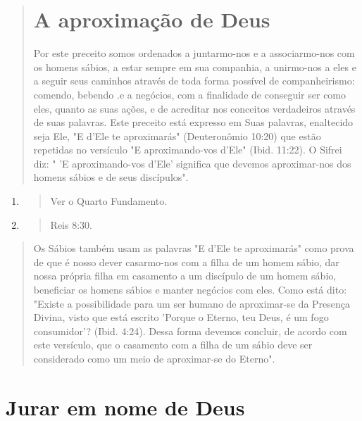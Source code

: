 \begin{quote}
\section{A aproximação de Deus}

Por este preceito somos ordenados a juntarmo-nos e a associarmo-nos com
os homens sábios, a estar sempre em sua companhia, a unirmo-nos a eles e
a seguir seus caminhos através de toda forma possível de
companheiris­mo: comendo, bebendo .e a negócios, com a finalidade de
conseguir ser como eles, quanto as suas ações, e de acreditar nos
conceitos verdadeiros através de suas palavras. Este preceito está
expresso em Suas palavras, enaltecido seja Ele, "E d'Ele te aproximarás"
(Deuteronômio 10:20) que estão repetidas no versí­culo "E
aproximando-vos d'Ele" (Ibid. 11:22). O Sifrei diz: " 'E aproximando-vos
d'Ele' significa que devemos aproximar-nos dos homens sábios e de seus
discípulos".
\end{quote}

\begin{enumerate}
\def\labelenumi{\arabic{enumi}.}
\setcounter{enumi}{28}
\item
 \begin{quote}
 Ver o Quarto Fundamento.
 \end{quote}
\item
 \begin{quote}
 Reis 8:30.
 \end{quote}
\end{enumerate}

\begin{quote}Os Sábios também usam as palavras "E d'Ele te aproximarás" como prova de
que é nosso dever casarmo-nos com a filha de um homem sábio, dar nossa
própria filha em casamento a um discípulo de um homem sábio, benefi­ciar
os homens sábios e manter negócios com eles. Como está dito: "Existe a
possibilidade para um ser humano de aproximar-se da Presença Divina,
visto que está escrito 'Porque o Eterno, teu Deus, é um fogo
consumidor'? (Ibid. 4:24). Dessa forma devemos concluir, de acordo com
este versículo, que o casamen­to com a filha de um sábio deve ser
considerado como um meio de aproximar-se do Eterno".
\end{quote}

\section{Jurar em nome de Deus}

